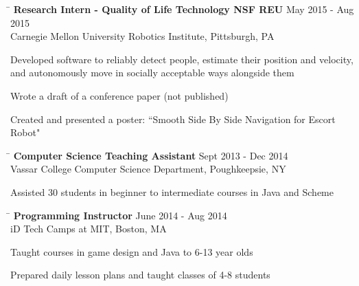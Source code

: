 \documentclass{res}
\begin{document}
\begin{resume}
{    \vspace{-12pt}
    \begin{tabbing}
      \hspace{5.65in}\=  \kill %
      {\bf Research Intern - Quality of Life Technology NSF REU}
      \>May 2015 - Aug 2015\\
      Carnegie Mellon University Robotics Institute, Pittsburgh, PA\\     
    \end{tabbing}
    \vspace{-24pt}      %
    \begin{list}{\bf{-}}{}
      \setlength{\itemsep}{-2pt}
      \item Developed software to reliably detect people, estimate their
            position and velocity,\\ and autonomously move in socially
            acceptable ways alongside them
      \item Wrote a draft of a conference paper (not published)
      \item Created and presented a poster: ``Smooth Side By Side Navigation for
            Escort Robot"
    \end{list}

    \vspace{-12pt}
    \begin{tabbing}
      \hspace{5.65in}\=  \kill %
      {\bf Computer Science Teaching Assistant}
      \>Sept 2013 - Dec 2014\\
      Vassar College Computer Science Department, Poughkeepsie, NY\\     
    \end{tabbing}
    \vspace{-24pt}      %
    \begin{list}{\bf{-}}{}
      \setlength{\itemsep}{-2pt}
      \item Assisted 30 students in beginner to intermediate courses in Java and
            Scheme
    \end{list}

    \vspace{-12pt}
    \begin{tabbing}
      \hspace{5.65in}\=  \kill %
      {\bf Programming Instructor}
      \>June 2014 - Aug 2014\\
      iD Tech Camps at MIT, Boston, MA\\     
    \end{tabbing}
    \vspace{-24pt}      %
    \begin{list}{\bf{-}}{}
      \setlength{\itemsep}{-2pt}
      \item Taught courses in game design and Java to 6-13 year olds
      \item Prepared daily lesson plans and taught classes of 4-8 students
    \end{list}
  
}
\end{resume}
\end{document}
